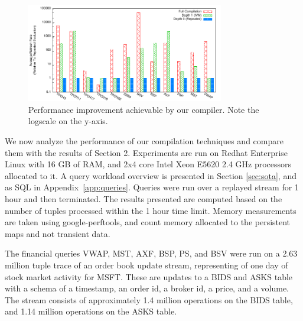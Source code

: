 
\newcommand{\figurewidth}[0]{1.8in}

\newcommand{\tablefig}[1]{
  \hspace*{-0.25in}
  \texttt{[image: ../graphs/graphs/\#1]}
}

\begin{figure}
\begin{center}
\includegraphics[width=3.4in]{../graphs/graphs/bakeoff.pdf}
\caption{Performance improvement achievable by our compiler.  Note the logscale on the y-axis. }
\label{fig:experiments:bakeoff}
\end{center}
\vspace*{-0.3in}
\end{figure}

We now analyze the performance of our compilation techniques and compare them with the results of Section 2.  Experiments are run on Redhat Enterprise Linux with 16 GB of RAM, and 2x4 core Intel Xeon E5620 2.4 GHz processors allocated to it.
A query workload overview is presented in Section \ref{sec:sota}, and as SQL in Appendix~\ref{app:queries}.
Queries were run over a replayed stream for 1 hour and then terminated. The results presented are computed based on the number of tuples processed within the 1 hour time limit.
Memory measurements are taken using google-perftools, and count memory allocated to the persistent maps and not transient data.  

The financial queries VWAP, MST, AXF, BSP, PS, and BSV were run on a 2.63 million tuple trace of an order book update stream, representing of one day of stock market activity for MSFT.  These are updates to a BIDS and ASKS table with a schema of a timestamp, an order id, a broker id, a price, and a volume.  The stream consists of approximately 1.4 million operations on the BIDS table, and 1.14 million operations on the ASKS table.  


